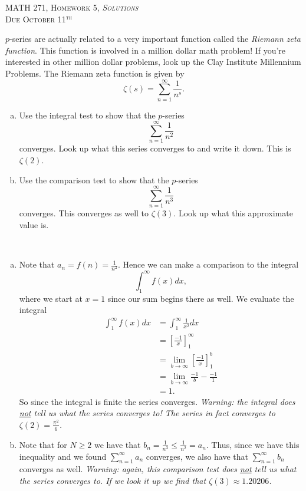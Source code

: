 \documentclass[12pt]{article} %
\begin{document}
\begin{center}
   \textsc{\large MATH 271, Homework 5, \emph{Solutions}}\\
   \textsc{Due October 11$^\textrm{th}$}
\end{center}
\vspace{.5cm}

\begin{problem} $p$-series are actually related to a very important function called the \emph{Riemann zeta function}.  This function is involved in a million dollar math problem! If you're interested in other million dollar problems, look up the Clay Institute Millennium Problems. The Riemann zeta function is given by
\[
\zeta (s) = \sum_{n=1}^\infty \frac{1}{n^s}.
\]
\begin{enumerate}[(a)]
    \item Use the integral test to show that the $p$-series
    \[
    \sum_{n=1}^\infty \frac{1}{n^2}
    \]
    converges.  Look up what this series converges to and write it down. This is $\zeta(2)$.
    \item Use the comparison test to show that the $p$-series
    \[
    \sum_{n=1}^\infty \frac{1}{n^3}
    \]
    converges. This converges as well to $\zeta(3)$. Look up what this approximate value is.
\end{enumerate}
\end{problem}
\begin{solution}~
\begin{enumerate}[(a)]
    \item Note that $a_n = f(n)=\frac{1}{n^2}$.  Hence we can make a comparison to the integral
    \[
    \int_1^\infty f(x)dx,
    \]
    where we start at $x=1$ since our sum begins there as well.  We evaluate the integral
    \begin{align*}
        \int_1^\infty f(x)dx &= \int_1^\infty \frac{1}{x^2}dx\\
        &= \left[\frac{-1}{x}\right]_1^\infty\\
        &= \lim_{b\to \infty} \left[ \frac{-1}{x}\right]_1^b\\
        &= \lim_{b\to \infty} \frac{-1}{b} - \frac{-1}{1}\\
        &= 1.
    \end{align*}
    So since the integral is finite the series converges.  \emph{Warning: the integral does \underline{not} tell us what the series converges to! The series in fact converges to $\zeta(2)=\frac{\pi^2}{6}$.}
    \item Note that for $N\geq 2$ we have that $b_n=\frac{1}{n^3}\leq \frac{1}{n^2}=a_n$. Thus, since we have this inequality and we found $\sum_{n=1}^\infty a_n$ converges, we also have that $\sum_{n=1}^\infty b_n$ converges as well. \emph{Warning: again, this comparison test does \underline{not} tell us what the series converges to. If we look it up we find that $\zeta(3)\approx 1.20206$.}
\end{enumerate}
\end{solution}
\end{document}
